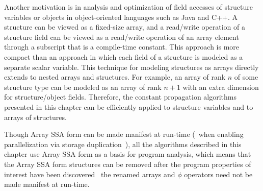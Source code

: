 Another motivation is in analysis and optimization of 
field accesses of
structure variables or objects in object-oriented languages
such as Java and C++.
A structure can be viewed as a fixed-size array, and
a read/write operation of a structure field can be viewed as a
read/write operation of an array element through a subscript that
is a compile-time constant.
This approach is more compact than an approach in which each field of
a structure is modeled as a separate scalar variable.
This technique for modeling structures as arrays
directly extends to 
nested arrays and structures.
For example, an array of rank $n$ of some
structure type  can be modeled as an array of rank $n+1$ with an extra dimension for structure/object fields. 
Therefore, the constant propagation algorithms presented
in this chapter can be efficiently applied to structure variables
and to arrays of structures.  


Though Array SSA form can be made manifest at run-time (\eg\ when enabling parallelization via storage duplication~\cite{KnSa98}), all the algorithms described in this chapter  use Array SSA form as a basis
for program analysis, 
which means that the Array SSA form
structures can be removed after the  program properties
of interest
have been discovered \ie\ the renamed arrays and $\phi$ operators
need not 
be made manifest at run-time.

